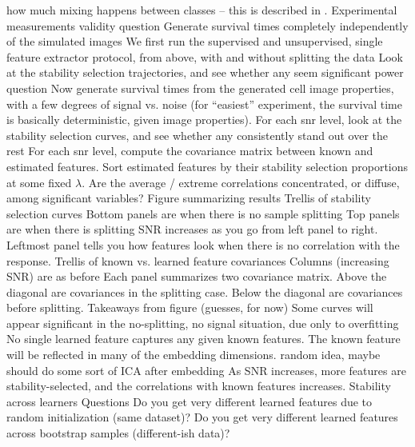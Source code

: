 \documentclass[11pt]{article}
\begin{document}
\begin{outline}
        how much mixing happens between classes -- this is described in
        \citep{diggle2013spatial}.
    \2 Experimental measurements
      \3 validity question
        \4 Generate survival times completely independently of the simulated
        images
        \4 We first run the supervised and unsupervised, single feature extractor
        protocol, from above, with and without splitting the data
        \4 Look at the stability selection trajectories, and see whether any
        seem significant
      \3 power question
        \4 Now generate survival times from the generated cell image properties,
        with a few degrees of signal vs. noise (for ``easiest'' experiment, the
        survival time is basically deterministic, given image properties).
        \4 For each snr level, look at the stability selection curves, and see
        whether any consistently stand out over the rest
        \4 For each snr level, compute the covariance matrix between known and
        estimated features. Sort estimated features by their stability selection
        proportions at some fixed $\lambda$. Are the average / extreme
        correlations concentrated, or diffuse, among significant variables?
    \2 Figure summarizing results
      \3 Trellis of stability selection curves
        \4 Bottom panels are when there is no sample splitting
        \4 Top panels are when there is splitting
        \4 SNR increases as you go from left panel to right. Leftmost panel
        tells you how features look when there is no correlation with the
        response.
      \3 Trellis of known vs. learned feature covariances
        \4 Columns (increasing SNR) are as before
        \4 Each panel summarizes two covariance matrix. Above the diagonal are
        covariances in the splitting case. Below the diagonal are covariances
        before splitting.
    \2 Takeaways from figure (guesses, for now)
      \3 Some curves will appear significant in the no-splitting, no signal
      situation, due only to overfitting
      \3 No single learned feature captures any given known features. The known
      feature will be reflected in many of the embedding dimensions.
        \4 random idea, maybe should do some sort of ICA after embedding
      \3 As SNR increases, more features are stability-selected, and the
      correlations with known features increases.
  \1 Stability across learners
    \2 Questions
      \3 Do you get very different learned features due to random initialization
      (same dataset)? Do you get very different learned features across
      bootstrap samples (different-ish data)?

\end{outline}
\end{document}
